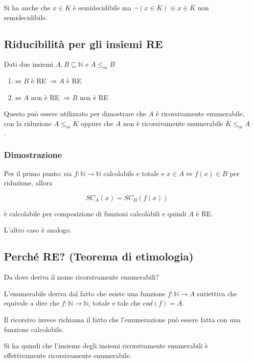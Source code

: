  Si ha anche che $x \in K$ è semidecidibile ma $\neg (x \in K) \equiv x \in \overline{K}$ non semidecidibile. 
 
 \subsection{Riducibilità per gli insiemi RE}
 
 Dati due insiemi $A,B \subseteq \mathbb{N}$ e $A \leq_m B$
 
 \begin{enumerate}
 	\item se $B$ è RE $\Rightarrow A$ è RE
 	\item  se $A$ non è RE $\Rightarrow B$ non è RE 
 \end{enumerate}
 
 Questo può essere utilizzato per dimostrare che $A$ è ricorsivamente enumerabile, con la riduzione $A \leq_m K$ oppure che $A$ non è ricorsivamente enumerabile $\overline{K} \leq_m A$.
 
 \subsubsection{Dimostrazione}
 
Per il primo punto: sia $f : \mathbb{N} \rightarrow \mathbb{N}$ calcolabile e totale e $x \in A \Leftrightarrow f(x) \in B$ per riduzione, allora 

$$
SC_A(x) = SC_B(f(x))
$$

è calcolabile per composizione di funzioni calcolabili e quindi $A$ è RE.

L'altro caso è analogo.

\subsection{Perché RE? (Teorema di etimologia)}

Da dove deriva il nome ricorsivamente enumerabili?

L'enumerabile deriva dal fatto che esiste una funzione $f : \mathbb{N} \rightarrow A$ suriettiva che equivale a dire che $f : \mathbb{N} \rightarrow \mathbb{N}$, totale e tale che $cod(f) = A$.

Il ricorsivo invece richiama il fatto che l'enumerazione può essere fatta con una funzione calcolabile.

Si ha quindi che l'insieme degli insiemi ricorsivamente enumerabili è effettivamente ricorsivamente enumerabile.

